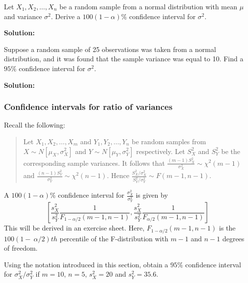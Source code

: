 \documentclass[12pt]{article}
\newenvironment{example}[1][Example:]{\begin{trivlist}
\item[\hskip \labelsep {\bfseries #1}]}{\end{trivlist}}
\begin{document}
\begin{example}
Let $X_{1},X_{2},\ldots,X_{n}$ be a random sample from a normal distribution with mean $\mu$ and variance $\sigma^2$. Derive a $100(1-\alpha)\%$ confidence interval for $\sigma^{2}.$
\end{example}

\begin{mdframed}
{\bf Solution:}
\textcolor[rgb]{1.00,1.00,1.00}{\lipsum[1-3]}
\end{mdframed}

\begin{example}
Suppose a random sample of 25 observations was taken from a normal distribution, and it was found that the sample variance was equal to 10. Find a $95\%$ confidence interval for $\sigma^2.$
\end{example}

\begin{mdframed}
{\bf Solution:}
\textcolor[rgb]{1.00,1.00,1.00}{\lipsum[1-4]}
\end{mdframed}

\subsubsection{Confidence intervals for ratio of variances}
Recall the following:
\begin{quote}
Let $X_{1},X_{2},\ldots,X_{m}$ and $Y_{1},Y_{2},\ldots,Y_{n}$ be  random samples from $X\sim N[\mu_{X},\sigma_{X}^{2}]$ and $Y\sim N[\mu_{Y},\sigma_{Y}^{2}] $ respectively. Let $S_{X}^{2}$ and $S_{Y}^{2}$ be the corresponding sample variances. It follows that $\displaystyle \frac{(m-1)S_{X}^{2}}{\sigma_{X}^{2}} \sim \chi^{2}(m-1)$ and $\displaystyle \frac{(n-1)S_{Y}^{2}}{\sigma_{Y}^{2}} \sim \chi^{2}(n-1).$ Hence $\displaystyle \frac{S_{X}^{2}/\sigma_{X}^{2}}{S_{Y}^{2}/\sigma_{Y}^{2}} \sim F(m-1,n-1).$
\end{quote}

 A $100(1-\alpha)\%$ confidence interval for $\displaystyle \frac{\sigma_{X}^{2}}{\sigma_{Y}^{2}}$ is given by
$$
\left[\frac{s_{X}^{2}}{s_{Y}^{2}}\frac{1}{F_{1-\alpha/2}(m-1,n-1)},\frac{s_{X}^{2}}{s_{Y}^{2}}\frac{1}{F_{\alpha/2}(m-1,n-1)}\right]
$$
This will be derived in an exercise sheet. Here, $F_{1-\alpha/2}(m-1,n-1)$ is the $100(1-~\alpha/2)th$ percentile of the F-distribution with $m-1$ and $n-1$ degrees of freedom.

\begin{example}
Using the notation introduced in this section, obtain a $95\%$ confidence interval for $\sigma_{X}^{2}/\sigma_{Y}^{2}$ if $m=10$, $n=5$, $s_{X}^{2}=20$ and $s_{Y}^{2}=35.6.$
\end{example}
\end{document}
